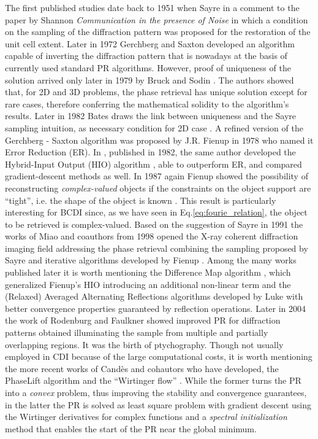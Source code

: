 The first published studies date back to 1951 when Sayre in a comment \cite{Sayre_1952} to the paper by 
Shannon \textit{Communication in the presence of Noise} \cite{Shannon_1949} in which a condition on the sampling of the diffraction 
pattern was proposed for the restoration of the unit cell extent. Later in 1972 Gerchberg and Saxton \cite{gerchberg1972} developed an 
algorithm capable of inverting the diffraction pattern that is nowadays at the basis of currently used standard PR algorithms. 
However, proof of uniqueness of the solution arrived only later in 1979 by Bruck and Sodin \cite{BruckSodin1979}. 
The authors showed that, for 2D and 3D problems, the phase retrieval has unique solution except for rare cases, therefore conferring the mathematical solidity to the algorithm's results. Later in 1982 Bates draws the link between uniqueness and 
the Sayre sampling intuition, as necessary condition for 2D case \cite{Bates1982}. A refined version of the Gerchberg - Saxton algorithm 
was proposed by J.R. Fienup in 1978 \cite{fienup_reconstruction_1978}
who named it Error Reduction (ER). In \cite{fienup_phase_1982}, published in 1982, the same author developed the Hybrid-Input Output (HIO) algorithm , 
able to outperform ER, and compared gradient-descent methods as well. In 1987 again Fienup showed the possibility of reconstructing 
\textit{complex-valued} objects if the constraints on the object support are ``tight'', i.e. the shape of the object 
is known \cite{Fienup1987}. This result is particularly interesting for BCDI since, as we have seen in Eq.\ref{eq:fourie_relation}, 
the object to be retrieved is complex-valued. 
Based on the suggestion of Sayre in 1991 \cite{sayre1991direct} the works of Miao and coauthors from 1998 
opened the X-ray coherent diffraction imaging field addressing the phase retrieval combining the sampling proposed by Sayre and
iterative algorithms developed by Fienup \cite{Miao1998, Miao1999, Miao2000}. Among the many works published later it is worth 
mentioning the Difference Map algorithm \cite{Elser2003}, which generalized Fienup's HIO introducing an additional 
non-linear term and the (Relaxed) Averaged Alternating Reflections algorithms developed by Luke \cite{AAR_2004, Luke_2004} 
with better convergence properties guaranteed by reflection operations. Later in 2004 the work of Rodenburg and Faulkner 
\cite{RodenburgFaulkner2004} showed improved
PR for diffraction patterns obtained illuminating the sample from multiple and partially overlapping regions. 
It was the birth of ptychography. Though not usually employed in CDI because of the 
large computational costs, it is worth mentioning the more recent works of Cand{\`e}s and cohautors who have developed, 
the PhaseLift algorithm \cite{CandesStrohmerVoroninski2013} and the ``Wirtinger flow'' \cite{Wirtinger1927}. While the 
former turns the PR into a \textit{convex} problem, thus improving the stability and convergence guarantees, in the latter 
the PR is solved as least square problem with gradient descent using the Wirtinger derivatives for complex functions 
and a \textit{spectral initialization} method that enables the start of the PR near the global minimum.

